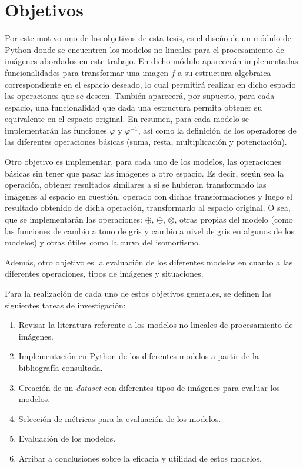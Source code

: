 \section*{Objetivos}

Por este motivo uno de los objetivos de esta tesis, es el dise\~no de un m\'odulo de Python donde se encuentren los modelos no lineales para el procesamiento de im\'agenes abordados en este trabajo. En dicho m\'odulo aparecer\'an implementadas funcionalidades para transformar una imagen $f$ a su estructura algebraica correspondiente en el espacio deseado, lo cual permitir\'a realizar en dicho espacio las operaciones que se deseen. Tambi\'en aparecer\'a, por supuesto, para cada espacio, una funcionalidad que dada una estructura permita obtener su equivalente en el espacio original. En resumen, para cada modelo se implementar\'an las funciones $\varphi$ y $\varphi^{-1}$, as\'i como la definici\'on de los operadores de las diferentes operaciones b\'asicas (suma, resta, multiplicaci\'on y potenciaci\'on).

Otro objetivo es implementar, para cada uno de los modelos, las operaciones b\'asicas sin tener que pasar las im\'agenes a otro espacio. Es decir, seg\'un sea la operaci\'on, obtener resultados similares a si se hubieran transformado las im\'agenes al espacio en cuesti\'on, operado con dichas transformaciones y luego el resultado obtenido de dicha operaci\'on, transformarlo al espacio original. O sea, que se implementar\'an las operaciones: $\oplus$, $\ominus$, $\otimes$, otras propias del modelo (como las funciones de cambio a tono de gris y cambio a nivel de gris en algunos de los modelos) y otras \'utiles como la curva del isomorfismo.

Adem\'as, otro objetivo es la evaluaci\'on de los diferentes modelos en cuanto a las diferentes operaciones, tipos de im\'agenes y situaciones.

Para la realizaci\'on de cada uno de estos objetivos generales, se definen las siguientes tareas de investigaci\'on:

\begin{enumerate}
	\item Revisar la literatura referente a los modelos no lineales de procesamiento de im\'agenes.
	\item Implementaci\'on en Python de los diferentes modelos a partir de la bibliograf\'ia consultada.
	\item Creaci\'on de un \textit{dataset} con diferentes tipos de im\'agenes para evaluar los modelos.
	\item Selecci\'on de m\'etricas para la evaluaci\'on de los modelos.
	\item Evaluaci\'on de los modelos.
	\item Arribar a conclusiones sobre la eficacia y utilidad de estos modelos. 
\end{enumerate}

